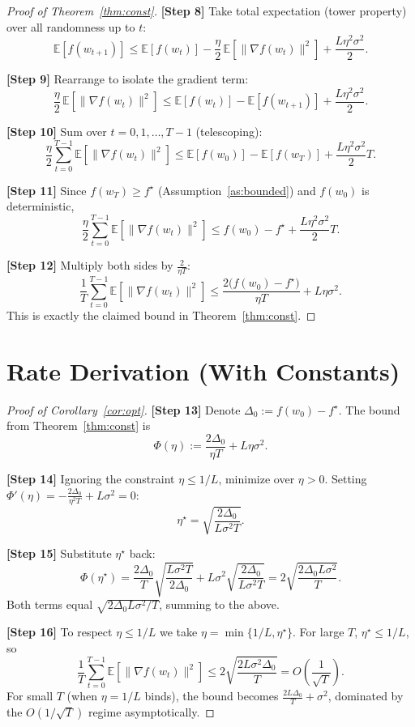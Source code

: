 \documentclass[11pt]{article}
\begin{document}
\begin{proof}[Proof of Theorem~\ref{thm:const}]
\textbf{[Step 8]} Take total expectation (tower property) over all
randomness up to $t$:
\[
\mathbb{E}[f(w_{t+1})]
\le \mathbb{E}[f(w_t)]-\frac{\eta}{2}\,\mathbb{E}[\|\nabla f(w_t)\|^2]
+\frac{L\eta^2\sigma^2}{2}.
\]

\textbf{[Step 9]} Rearrange to isolate the gradient term:
\[
\frac{\eta}{2}\,\mathbb{E}[\|\nabla f(w_t)\|^2]
\le \mathbb{E}[f(w_t)]-\mathbb{E}[f(w_{t+1})]
+\frac{L\eta^2\sigma^2}{2}.
\]

\textbf{[Step 10]} Sum over $t=0,1,\dots,T-1$ (telescoping):
\[
\frac{\eta}{2}\sum_{t=0}^{T-1}\mathbb{E}[\|\nabla f(w_t)\|^2]
\le \mathbb{E}[f(w_0)]-\mathbb{E}[f(w_T)]
+\frac{L\eta^2\sigma^2}{2}T.
\]

\textbf{[Step 11]} Since $f(w_T)\ge f^\star$ (Assumption~\ref{as:bounded})
and $f(w_0)$ is deterministic,
\[
\frac{\eta}{2}\sum_{t=0}^{T-1}\mathbb{E}[\|\nabla f(w_t)\|^2]
\le f(w_0)-f^\star+\frac{L\eta^2\sigma^2}{2}T.
\]

\textbf{[Step 12]} Multiply both sides by $\frac{2}{\eta T}$:
\[
\frac{1}{T}\sum_{t=0}^{T-1}\mathbb{E}[\|\nabla f(w_t)\|^2]
\le \frac{2\bigl(f(w_0)-f^\star\bigr)}{\eta T}+L\eta\sigma^2.
\]
This is exactly the claimed bound in Theorem~\ref{thm:const}.
\end{proof}

\section*{Rate Derivation (With Constants)}
\begin{proof}[Proof of Corollary~\ref{cor:opt}]
\textbf{[Step 13]} Denote $\Delta_0:=f(w_0)-f^\star$. The bound from
Theorem~\ref{thm:const} is
\[
\Phi(\eta):=\frac{2\Delta_0}{\eta T}+L\eta\sigma^2.
\]

\textbf{[Step 14]} Ignoring the constraint $\eta\le1/L$, minimize over
$\eta>0$. Setting $\Phi'(\eta)=-\frac{2\Delta_0}{\eta^2 T}+L\sigma^2=0$:
\[
\eta^\star=\sqrt{\frac{2\Delta_0}{L\sigma^2 T}}.
\]

\textbf{[Step 15]} Substitute $\eta^\star$ back:
\[
\Phi(\eta^\star)
=\frac{2\Delta_0}{T}\sqrt{\frac{L\sigma^2 T}{2\Delta_0}}
+L\sigma^2\sqrt{\frac{2\Delta_0}{L\sigma^2 T}}
=2\sqrt{\frac{2\Delta_0 L\sigma^2}{T}}.
\]
Both terms equal $\sqrt{2\Delta_0 L\sigma^2/T}$, summing to the above.

\textbf{[Step 16]} To respect $\eta\le1/L$ we take
$\eta=\min\{1/L,\eta^\star\}$. For large $T$, $\eta^\star\le1/L$, so
\[
\frac{1}{T}\sum_{t=0}^{T-1}\mathbb{E}[\|\nabla f(w_t)\|^2]
\le 2\sqrt{\frac{2L\sigma^2\Delta_0}{T}}=O\!\left(\frac{1}{\sqrt{T}}\right).
\]
For small $T$ (when $\eta=1/L$ binds), the bound becomes
$\frac{2L\Delta_0}{T}+\sigma^2$, dominated by the $O(1/\sqrt{T})$ regime
asymptotically.
\end{proof}
\end{document}
